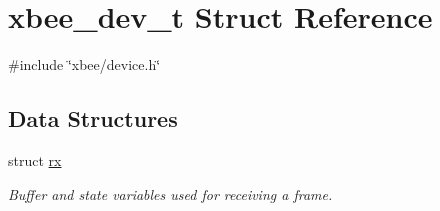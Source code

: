 \hypertarget{structxbee__dev__t}{\section{xbee\-\_\-dev\-\_\-t Struct Reference}
\label{structxbee__dev__t}
}


{\ttfamily \#include \char`\"{}xbee/device.\-h\char`\"{}}

\subsection*{Data Structures}
\begin{DoxyCompactItemize}
\item 
struct \hyperlink{structxbee__dev__t_1_1rx}{rx}
\begin{DoxyCompactList}\small\item\em Buffer and state variables used for receiving a frame. \end{DoxyCompactList}\end{DoxyCompactItemize}
